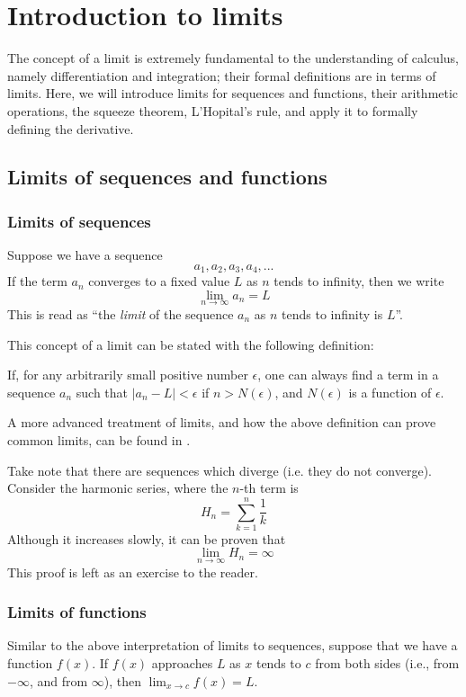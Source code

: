 \chapter{Introduction to limits}
The concept of a limit is extremely fundamental to the understanding of calculus, namely differentiation
and integration; their formal definitions are in terms of limits. Here, we will introduce limits for
sequences and functions, their arithmetic operations, the squeeze theorem, L'Hopital's rule, and
apply it to formally defining the derivative.

\section{Limits of sequences and functions}

\subsection{Limits of sequences}
Suppose we have a sequence
\[
a_1,a_2,a_3,a_4,...
\]
If the term $a_n$ converges to a fixed value $L$ as $n$ tends to infinity, then we write
\[
\lim_{n \to \infty} a_n = L
\]
This is read as ``the \textit{limit} of the sequence ${a_n}$ as $n$ tends to infinity is $L$''.

This concept of a limit can be stated with the following definition:
\begin{definition}
    If, for any arbitrarily small positive number $\epsilon$, one can always find a term in a sequence ${a_n}$
    such that $|a_n - L| < \epsilon$ if $n > N(\epsilon)$, and $N(\epsilon)$ is a function of $\epsilon$.
\end{definition}

A more advanced treatment of limits, and how the above definition can prove common limits, can be found in
\cite{Gong_2017}.

Take note that there are sequences which diverge (i.e. they do not converge). Consider the harmonic series,
where the $n$-th term is \[H_n = \sum_{k = 1}^n \frac{1}{k}\] Although it increases slowly, it can be proven
that \[\lim_{n \to \infty} H_n = \infty\] This proof is left as an exercise to the reader.

\subsection{Limits of functions}
Similar to the above interpretation of limits to sequences, suppose that we have a function
$f(x)$. If $f(x)$ approaches $L$ as $x$ tends to $c$ from both sides (i.e., from $-\infty$, and from $\infty$),
then $\lim_{x \to c} f(x) = L$.

